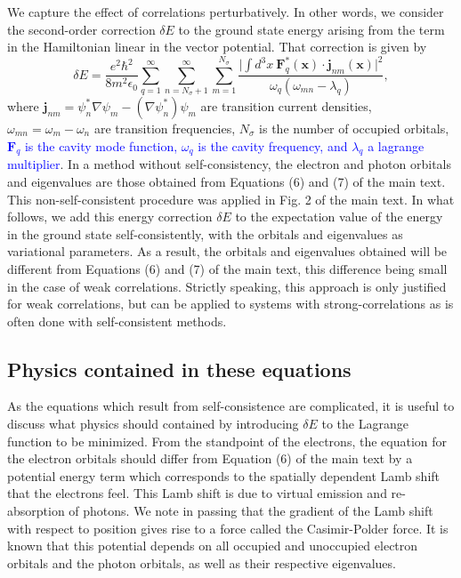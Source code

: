 \documentclass[aps,prb,onecolumn,preprint,
	groupedaddress,superscriptaddress,
	amsfonts,amssymb,amsmath,floatfix,
	citeautoscript]{revtex4-1}
\newcommand{\Jadd}[1]{\textcolor{blue}{#1}}
\begin{document}
We capture the effect of correlations perturbatively. In other words, we consider the second-order correction $\delta E$ to the ground state energy arising from the term in the Hamiltonian linear in the vector potential. That correction is given by
\begin{equation}
\delta E = \frac{e^2\hbar^2}{8m^2\epsilon_0}\sum\limits_{q=1}^{\infty}\sum_{n=N_{\sigma}+1}^{\infty}\sum\limits_{m=1}^{N_{\sigma}} \frac{\Big| \int d^3x~\mathbf{F}_q^*(\mathbf{x})\cdot\mathbf{j}_{nm}(\mathbf{x})\Big|^2}{\omega_q(\omega_{mn} -\lambda_q)},
\end{equation}
where $\mathbf{j}_{nm} = \psi^*_n\nabla\psi_m - (\nabla\psi^*_n)\psi_m$ are transition current densities, $\omega_{mn} = \omega_m - \omega_n$ are transition frequencies, $N_{\sigma}$ is the number of occupied orbitals, \Jadd{$\textbf{F}_q$ is the cavity mode function, $\omega_q$ is the cavity frequency, and $\lambda_q$ a lagrange multiplier}.  In a method without self-consistency, the electron and photon orbitals and eigenvalues are those obtained from Equations (6) and (7) of the main text. This non-self-consistent procedure was applied in Fig. 2 of the main text. In what follows, we add this energy correction $\delta E$ to the expectation value of the energy in the ground state self-consistently, with the orbitals and eigenvalues as variational parameters. As a result, the orbitals and eigenvalues obtained will be different from Equations (6) and (7) of the main text, this difference being small in the case of weak correlations. Strictly speaking, this approach is only justified for weak correlations, but can be applied to systems with strong-correlations as is often done with self-consistent methods. 

\subsection{Physics contained in these equations}

As the equations which result from self-consistence are complicated, it is useful to discuss what physics should contained by introducing $\delta E$ to the Lagrange function to be minimized. From the standpoint of the electrons, the equation for the electron orbitals should differ from Equation (6) of the main text by a potential energy term which corresponds to the spatially dependent Lamb shift  that the electrons feel. This Lamb shift is due to virtual emission and re-absorption of photons. We note in passing that the gradient of the Lamb shift with respect to position gives rise to a force called the Casimir-Polder force.  It is known that this potential depends on all occupied and unoccupied electron orbitals and the photon orbitals, as well as their respective eigenvalues. 
\end{document}

